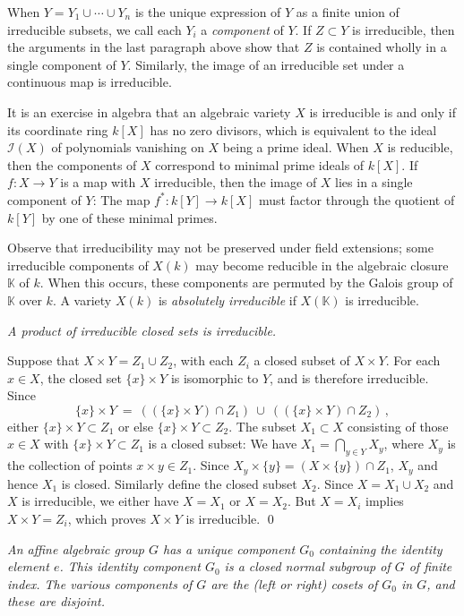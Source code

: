 \documentclass[12pt]{amsart}
\begin{document}
When $Y=Y_1\cup\cdots\cup Y_n$ is the unique expression of $Y$ as a finite
union of irreducible subsets, we call each $Y_i$ a {\sl component} of $Y$.
If $Z\subset Y$ is irreducible, then the arguments in the last paragraph
above show that $Z$ is contained wholly in a single
component of $Y$.
Similarly, the image of an irreducible set under a continuous map is
irreducible.


It is an exercise in algebra that an algebraic variety $X$ is irreducible is
and only if its coordinate ring $k[X]$ has no zero divisors, which is
equivalent to the ideal ${\mathcal I}(X)$ of polynomials vanishing on $X$
being a prime ideal. 
When $X$ is reducible, then the components of $X$ correspond to minimal
prime ideals of $k[X]$.
If $f\colon X \to Y$ is a map with $X$ irreducible, then the image of $X$
lies in a single component of $Y$:
The map $f^*:k[Y]\to k[X]$ must factor through the quotient of $k[Y]$ by one
of these minimal primes.

Observe that irreducibility may not be preserved under field extensions;
some irreducible components of $X(k)$ may become reducible in the algebraic
closure ${\mathbb K}$ of $k$.
When this occurs, these components are permuted by the Galois group of 
${\mathbb K}$ over $k$.
A variety $X(k)$ is {\sl absolutely irreducible} if $X({\mathbb K})$ is
irreducible.
\medskip

{\it A product of irreducible closed sets is irreducible.}\medskip

Suppose that $X\times Y=Z_1\cup Z_2$,
with each $Z_i$ a closed subset of $X\times Y$.
For each $x\in X$, the closed set $\{x\}\times Y$ is isomorphic to $Y$, and
is therefore irreducible.
Since 
$$
  \{x\}\times Y\ =\ ((\{x\}\times Y)\cap Z_1)\   \cup\  
                   ((\{x\}\times Y)\cap Z_2)\,,
$$
either $\{x\}\times Y\subset Z_1$ or else 
$\{x\}\times Y\subset Z_2$.
The subset $X_1\subset X$ consisting of those $x\in X$ with 
$\{x\}\times Y\subset Z_1$ is a closed subset:
We have $X_1=\bigcap_{y\in Y} X_y$, where $X_y$ is the collection of points
$x\times y\in Z_1$.
Since $X_y\times \{y\}=(X\times \{y\})\cap Z_1$, $X_y$ and hence $X_1$ is
closed.
Similarly define the closed subset $X_2$.
Since $X=X_1\cup X_2$ and $X$ is irreducible, we either have $X=X_1$ or
$X=X_2$.
But $X=X_i$ implies $X\times Y=Z_i$, which proves $X\times Y$ is
irreducible.
\qed
\bigskip

{\it
An affine algebraic group $G$ has a unique component $G_0$ containing the
identity element $e$.
This identity component $G_0$ is a closed normal subgroup of $G$ of finite
index.
The various components of $G$ are the (left or right) cosets of $G_0$ in
$G$, and these are disjoint.}\medskip
\end{document}
